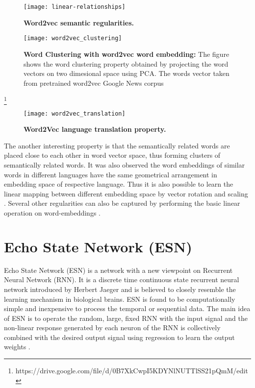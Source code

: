 \begin{figure}[hbtp]
\centering
\texttt{[image: linear-relationships]}
\caption[Word2vec semantic regularities]{\textbf{Word2vec semantic regularities.}} 
\label{fig:sem_rel}
\end{figure}

\begin{figure}[hbtp]
\centering
\texttt{[image: word2vec\_clustering]}
\caption [Word2Vec word clustering]{\textbf{Word Clustering with word2vec word embedding:} The figure shows the word clustering property obtained by projecting the word vectors on two dimesional space using PCA. The words vector taken from pretrained word2vec Google News corpus\footnotemark }
\label{fig:w2v_clustering}
\end{figure}

\footnote{https://drive.google.com/file/d/0B7XkCwpI5KDYNlNUTTlSS21pQmM/edit}

\begin{figure}[hbtp]
\centering
\texttt{[image: word2vec\_translation]}
\caption[Word2Vec language translation property]{\textbf{Word2Vec language translation property.}}
\label{fig:w2v_translation}
\end{figure}

The another interesting property is that the semantically related words are placed close to each other in word vector space, thus forming clusters of semantically related words. It was also observed the word embeddings of similar words in different languages have the same geometrical arrangement in embedding space of respective language. Thus it is also possible to learn the linear mapping between different embedding space by vector rotation and scaling \cite{w2v:language_similarities}. Several other regularities can also be captured by performing the basic linear operation on word-embeddings \cite{w2v:mikolov_2013_distributed}. 

\section{Echo State Network (ESN)}

Echo State Network (ESN) is a network with a new viewpoint on Recurrent Neural Network (RNN). It is a discrete time continuous state recurrent neural network introduced by Herbert Jaeger \cite{esn:jaeger:2001} and is believed to closely resemble the learning mechanism in biological brains. ESN is found to be computationally simple and inexpensive to process the temporal or sequential data. The main idea of ESN is to operate the random, large, fixed RNN with the input signal and the non-linear response generated by each neuron of the RNN is collectively combined with the desired output signal using regression to learn the output weights \cite{esn:jaeger_tutorial, esn:jaeger:2001,esn:scholarpedia:2007}.


